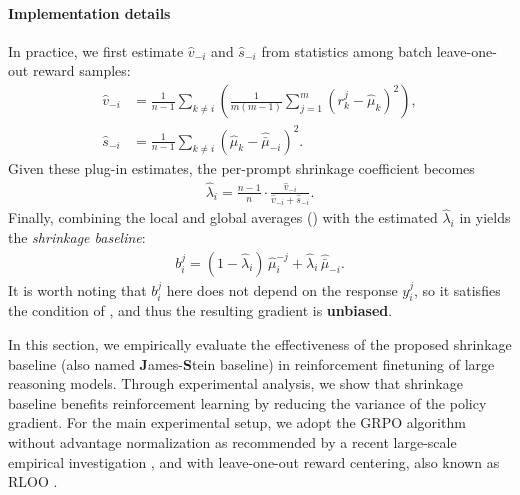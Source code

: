 \documentclass{article}
\makeatletter
\theoremstyle{plain}
\theoremstyle{definition}
\theoremstyle{remark}
\newlength{\secvspace}
\let\originalsection\section
\renewcommand{\section}{\@ifstar{\@sectionstar}{\@sectionnormal}}
\newcommand{\@sectionnormal}[1]{%
  \vspace{-\secvspace}%
  \originalsection{#1}%
  \vspace{-\secvspace}%
}
\newcommand{\@sectionstar}[1]{%
  \vspace{-\secvspace}%
  \originalsection*{#1}%
  \vspace{-\secvspace}%
}
\makeatother
\begin{document}
\paragraph{Implementation details}
  In practice, we first estimate $\widehat{v}_{-i}$ and $\widehat{s}_{-i}$ from statistics among batch leave-one-out reward samples:
\begin{align}
\widehat{v}_{-i} &= \textstyle \tfrac{1}{n-1} \sum_{k\ne i}
        \left(
            \tfrac{1}{m(m-1)} \sum_{j=1}^{m} (r_k^j - \hat\mu_k)^2
        \right), \label{eq:v-est} \\
\widehat{s}_{-i} &= \textstyle \tfrac{1}{n-1} \sum_{k\ne i}
        (\hat\mu_k - \hat{\bar\mu}_{-i})^2. \label{eq:s-est}
\end{align}
  Given these plug-in estimates, the per-prompt shrinkage coefficient becomes
\begin{align}
\hat \lambda_i = \textstyle \tfrac{n-1}{n} \cdot
    \tfrac{\widehat{v}_{-i}}{\widehat{v}_{-i} + \widehat{s}_{-i}}.
\label{eq:lambda-est}
\end{align}
  Finally, combining the local and global averages () with the estimated $\hat \lambda_i$ in  yields the \emph{shrinkage baseline}:
\begin{align}
b_i^j = \textstyle (1 - \hat \lambda_i)\, \hat \mu_i^{-j} + \hat \lambda_i\, \hat{\bar \mu}_{-i}.
\label{eq:js-final-baseline}
\end{align}
  It is worth noting that $b_i^j$ here does not depend on the response $y_i^j$, so it satisfies the condition of , and thus the resulting gradient is \textbf{unbiased}.

\section{Experimental Analysis}
  \label{sec:exp}
  
  In this section, we empirically evaluate the effectiveness of the proposed shrinkage baseline (also named \textbf{J}ames-\textbf{S}tein baseline) in reinforcement finetuning of large reasoning models. Through experimental analysis, we show that shrinkage baseline benefits reinforcement learning by reducing the variance of the policy gradient. For the main experimental setup, we adopt the GRPO algorithm \citep{shao2024deepseekmath} without advantage normalization as recommended by a recent large-scale empirical investigation \citep{khatri2025art}, and with leave-one-out reward centering, also known as RLOO \citep{ahmadian2024back}. 
\end{document}
